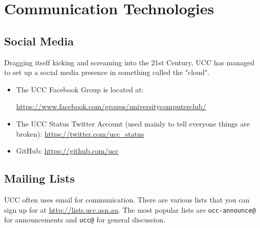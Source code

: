 \chapter{Communication Technologies}\label{Communications}


\newenvironment{ucclist}[1]
{
	\begin{mdframed}[nobreak=true]
	\subsection{#1}
	\begin{mdframed}
		Address:  <\href{mailto:#1@ucc.asn.au}{#1@ucc.asn.au}>
	\end{mdframed}
	\begin{mdframed}
		Subscribe:  \small{\url{http://lists.ucc.asn.au/mailman/listinfo/#1}}
	\end{mdframed}


	
}{\end{mdframed}}
\section{Social Media}

Dragging itself kicking and screaming into the 21st Century, UCC has managed to set up a social media presence in something called the "cloud".

\begin{itemize}
\item The UCC Facebook Group is located at: 

\url{https://www.facebook.com/groups/universitycomputerclub/}
\item The UCC Status Twitter Account (used mainly to tell everyone things are broken): \url{https://twitter.com/ucc_status}
\item GitHub: \url{https://github.com/ucc}

\end{itemize}

\section{Mailing Lists}

UCC often uses email for communication. There are various lists that you can sign up for at \url{http://lists.ucc.asn.au}. The most popular lists are \texttt{ucc-announce@} for announcements and \texttt{ucc@} for general discussion.


